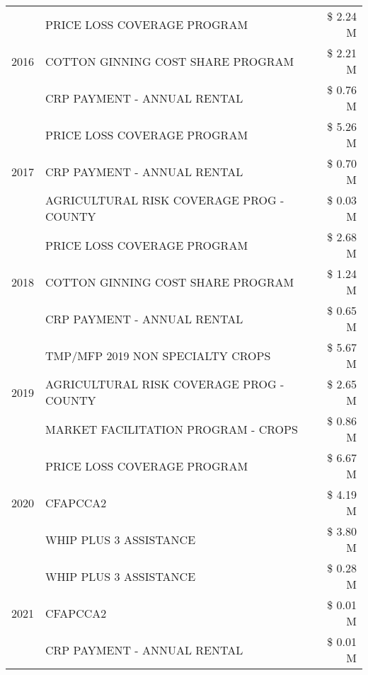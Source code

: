 \begin{tabular}{llr}
\cline{1-3}
\multirow[t]{3}{*}{2016} & PRICE LOSS COVERAGE PROGRAM & \$ 2.24 M \\
 & COTTON GINNING COST SHARE PROGRAM & \$ 2.21 M \\
 & CRP PAYMENT - ANNUAL RENTAL & \$ 0.76 M \\
\cline{1-3}
\multirow[t]{3}{*}{2017} & PRICE LOSS COVERAGE PROGRAM & \$ 5.26 M \\
 & CRP PAYMENT - ANNUAL RENTAL & \$ 0.70 M \\
 & AGRICULTURAL RISK COVERAGE PROG - COUNTY & \$ 0.03 M \\
\cline{1-3}
\multirow[t]{3}{*}{2018} & PRICE LOSS COVERAGE PROGRAM & \$ 2.68 M \\
 & COTTON GINNING COST SHARE PROGRAM & \$ 1.24 M \\
 & CRP PAYMENT - ANNUAL RENTAL & \$ 0.65 M \\
\cline{1-3}
\multirow[t]{3}{*}{2019} & TMP/MFP 2019 NON SPECIALTY CROPS & \$ 5.67 M \\
 & AGRICULTURAL RISK COVERAGE PROG - COUNTY & \$ 2.65 M \\
 & MARKET FACILITATION PROGRAM - CROPS & \$ 0.86 M \\
\cline{1-3}
\multirow[t]{3}{*}{2020} & PRICE LOSS COVERAGE PROGRAM & \$ 6.67 M \\
 & CFAPCCA2 & \$ 4.19 M \\
 & WHIP PLUS 3 ASSISTANCE & \$ 3.80 M \\
\cline{1-3}
\multirow[t]{3}{*}{2021} & WHIP PLUS 3 ASSISTANCE & \$ 0.28 M \\
 & CFAPCCA2 & \$ 0.01 M \\
 & CRP PAYMENT - ANNUAL RENTAL & \$ 0.01 M \\
\cline{1-3}
\bottomrule
\end{tabular}
